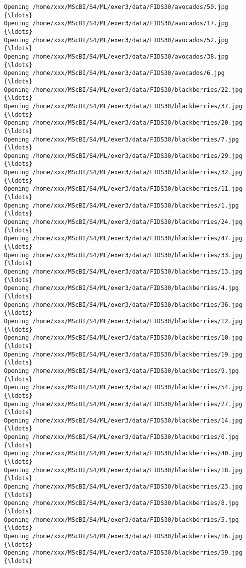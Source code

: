 \documentclass[11pt]{article}
\begin{document}
\begin{Verbatim}[commandchars=\\\{\}]
Opening /home/xxx/MScBI/S4/ML/exer3/data/FIDS30/avocados/50.jpg  {\ldots}
Opening /home/xxx/MScBI/S4/ML/exer3/data/FIDS30/avocados/17.jpg  {\ldots}
Opening /home/xxx/MScBI/S4/ML/exer3/data/FIDS30/avocados/52.jpg  {\ldots}
Opening /home/xxx/MScBI/S4/ML/exer3/data/FIDS30/avocados/38.jpg  {\ldots}
Opening /home/xxx/MScBI/S4/ML/exer3/data/FIDS30/avocados/6.jpg  {\ldots}
Opening /home/xxx/MScBI/S4/ML/exer3/data/FIDS30/blackberries/22.jpg  {\ldots}
Opening /home/xxx/MScBI/S4/ML/exer3/data/FIDS30/blackberries/37.jpg  {\ldots}
Opening /home/xxx/MScBI/S4/ML/exer3/data/FIDS30/blackberries/20.jpg  {\ldots}
Opening /home/xxx/MScBI/S4/ML/exer3/data/FIDS30/blackberries/7.jpg  {\ldots}
Opening /home/xxx/MScBI/S4/ML/exer3/data/FIDS30/blackberries/29.jpg  {\ldots}
Opening /home/xxx/MScBI/S4/ML/exer3/data/FIDS30/blackberries/32.jpg  {\ldots}
Opening /home/xxx/MScBI/S4/ML/exer3/data/FIDS30/blackberries/11.jpg  {\ldots}
Opening /home/xxx/MScBI/S4/ML/exer3/data/FIDS30/blackberries/1.jpg  {\ldots}
Opening /home/xxx/MScBI/S4/ML/exer3/data/FIDS30/blackberries/24.jpg  {\ldots}
Opening /home/xxx/MScBI/S4/ML/exer3/data/FIDS30/blackberries/47.jpg  {\ldots}
Opening /home/xxx/MScBI/S4/ML/exer3/data/FIDS30/blackberries/33.jpg  {\ldots}
Opening /home/xxx/MScBI/S4/ML/exer3/data/FIDS30/blackberries/13.jpg  {\ldots}
Opening /home/xxx/MScBI/S4/ML/exer3/data/FIDS30/blackberries/4.jpg  {\ldots}
Opening /home/xxx/MScBI/S4/ML/exer3/data/FIDS30/blackberries/36.jpg  {\ldots}
Opening /home/xxx/MScBI/S4/ML/exer3/data/FIDS30/blackberries/12.jpg  {\ldots}
Opening /home/xxx/MScBI/S4/ML/exer3/data/FIDS30/blackberries/10.jpg  {\ldots}
Opening /home/xxx/MScBI/S4/ML/exer3/data/FIDS30/blackberries/19.jpg  {\ldots}
Opening /home/xxx/MScBI/S4/ML/exer3/data/FIDS30/blackberries/9.jpg  {\ldots}
Opening /home/xxx/MScBI/S4/ML/exer3/data/FIDS30/blackberries/54.jpg  {\ldots}
Opening /home/xxx/MScBI/S4/ML/exer3/data/FIDS30/blackberries/27.jpg  {\ldots}
Opening /home/xxx/MScBI/S4/ML/exer3/data/FIDS30/blackberries/14.jpg  {\ldots}
Opening /home/xxx/MScBI/S4/ML/exer3/data/FIDS30/blackberries/0.jpg  {\ldots}
Opening /home/xxx/MScBI/S4/ML/exer3/data/FIDS30/blackberries/40.jpg  {\ldots}
Opening /home/xxx/MScBI/S4/ML/exer3/data/FIDS30/blackberries/18.jpg  {\ldots}
Opening /home/xxx/MScBI/S4/ML/exer3/data/FIDS30/blackberries/23.jpg  {\ldots}
Opening /home/xxx/MScBI/S4/ML/exer3/data/FIDS30/blackberries/8.jpg  {\ldots}
Opening /home/xxx/MScBI/S4/ML/exer3/data/FIDS30/blackberries/5.jpg  {\ldots}
Opening /home/xxx/MScBI/S4/ML/exer3/data/FIDS30/blackberries/16.jpg  {\ldots}
Opening /home/xxx/MScBI/S4/ML/exer3/data/FIDS30/blackberries/59.jpg  {\ldots}

\end{Verbatim}
\end{document}
